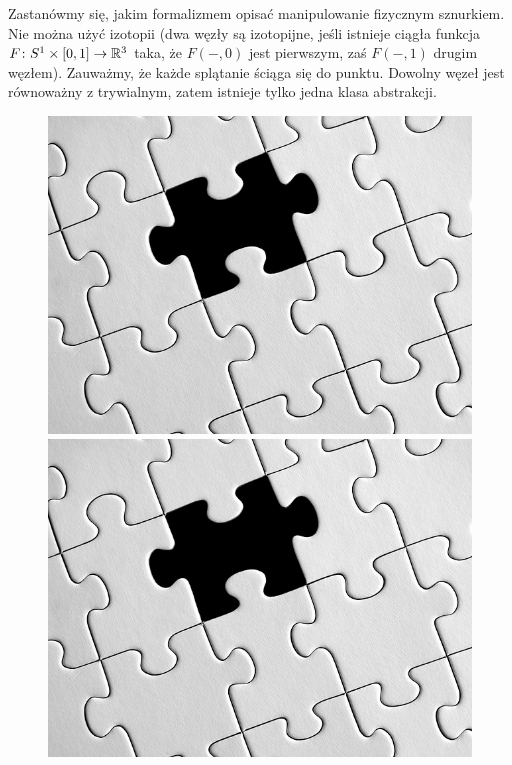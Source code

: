 Zastanówmy się, jakim formalizmem opisać manipulowanie fizycznym sznurkiem.
Nie można użyć izotopii
(dwa węzły są izotopijne, jeśli istnieje ciągła funkcja $F \colon S^1 \times [0, 1] \to \mathbb R^3$ taka, że $F(-, 0)$ jest pierwszym, zaś $F(-,1)$ drugim węzłem).
Zauważmy, że każde splątanie ściąga się do punktu.
Dowolny węzeł jest równoważny z trywialnym, zatem istnieje tylko jedna klasa abstrakcji.
\begin{figure}[H]
	\begin{minipage}[b]{.23\linewidth}
		\centering
		\includegraphics[width=\linewidth]{../data/missing.jpg}
	\end{minipage}
	\begin{minipage}[b]{.23\linewidth}
		\centering
		\includegraphics[width=\linewidth]{../data/missing.jpg}

\end{minipage}
\end{figure}
